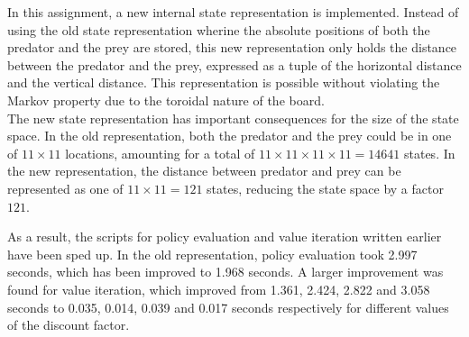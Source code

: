 In this assignment, a new internal state representation is implemented. Instead of using the old state representation wherine the absolute positions of both the predator and the prey are stored, this new representation only holds the distance between the predator and the prey, expressed as a tuple of the horizontal distance and the vertical distance. This representation is possible without violating the Markov property due to the toroidal nature of the board. \\

The new state representation has important consequences for the size of the state space. In the old representation, both the predator and the prey could be in one of $11 \times 11$ locations, amounting for a total of $11 \times 11 \times 11 \times 11 = 14641$ states. In the new representation, the distance between predator and prey can be represented as one of $11 \times 11 = 121$ states, reducing the state space by a factor $121$.

As a result, the scripts for policy evaluation and value iteration written earlier have been sped up. In the old representation, policy evaluation took 2.997 seconds, which has been improved to 1.968 seconds. A larger improvement was found for value iteration, which improved from 1.361, 2.424, 2.822 and 3.058 seconds to 0.035, 0.014, 0.039 and 0.017 seconds respectively for different values of the discount factor.